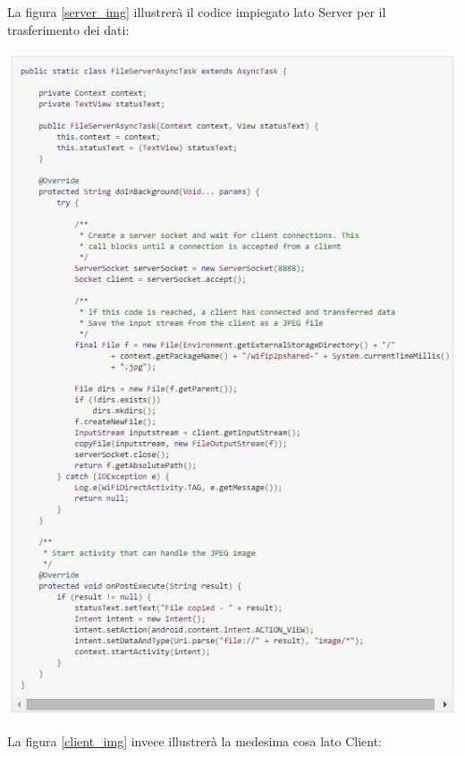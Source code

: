 La figura \ref{server_img} illustrerà il codice impiegato lato Server per il trasferimento dei dati:

\begin{center}
\includegraphics[width=1\textwidth]{imgs/server.jpg}
\label{server_img}%
\end{center}

La figura \ref{client_img} invece illustrerà la medesima cosa lato Client:

